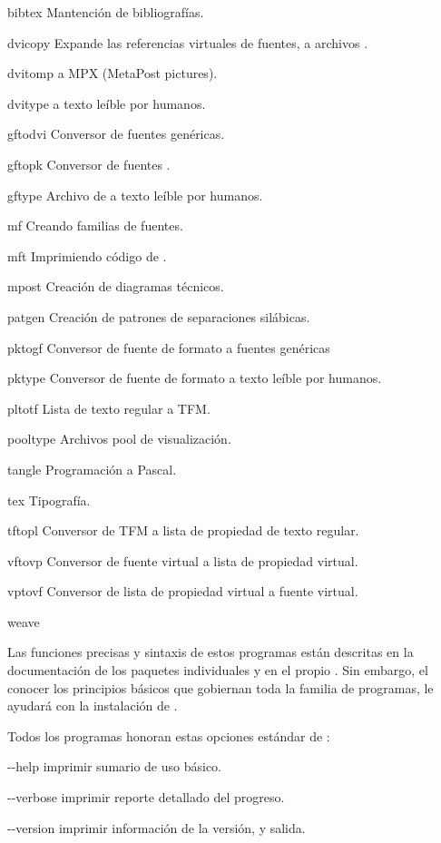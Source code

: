 \documentclass{article}
\begin{document}
\begin{cmddescription}
\item[bibtex]    Mantención de bibliografías.
\item[dvicopy]   Expande las referencias virtuales de fuentes, a archivos
	\dvi{}.
\item[dvitomp]   \dvi{} a MPX (MetaPost pictures).
\item[dvitype]   \dvi{} a texto leíble por humanos.
\item[gftodvi]   Conversor de fuentes genéricas.
\item[gftopk]    Conversor de fuentes .
\item[gftype]    Archivo de  a texto leíble por humanos.
\item[mf]        Creando familias de fuentes.
\item[mft]       Imprimiendo código de \MF{}.
\item[mpost]     Creación de diagramas técnicos. 
\item[patgen]    Creación de patrones de separaciones silábicas.
\item[pktogf]    Conversor de fuente de formato  a fuentes genéricas
\item[pktype]    Conversor de fuente de formato  a texto leíble por
humanos. 
\item[pltotf]    Lista de texto regular a TFM. 
\item[pooltype]  Archivos pool \web{} de visualización. 
\item[tangle]    Programación \web{} a Pascal.
\item[tex]       Tipografía.
\item[tftopl]    Conversor de TFM a lista de propiedad de texto regular.
\item[vftovp]    Conversor de fuente virtual a lista de propiedad virtual. 
\item[vptovf]    Conversor de lista de propiedad virtual a fuente virtual.
\item[weave]     \web{} 
\end{cmddescription}

\noindent Las funciones precisas y sintaxis de estos
programas están descritas en la documentación de los
paquetes individuales y en el propio \Webc{}. Sin embargo,
el conocer los principios básicos que gobiernan toda la
familia de programas, le ayudará con la instalación de
\Webc{}. 

Todos los programas honoran estas opciones estándar de \GNU{}:
\begin{ttdescription}
	\item[-{}-help] imprimir sumario de uso básico. 
	\item[-{}-verbose] imprimir reporte detallado del progreso. 
	\item[-{}-version] imprimir información de la versión, y
		salida.
\end{ttdescription}
\end{document}
